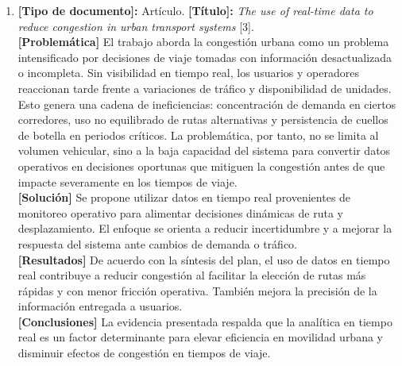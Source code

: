 \begin{enumerate}
    \item \textbf{[Tipo de documento]:} Artículo. \textbf{[Título]:} \textit{The use of real-time data to reduce congestion in urban transport systems} [3].\\
    \textbf{[Problemática]} El trabajo aborda la congesti\'{o}n urbana como un problema intensificado por decisiones de viaje tomadas con informaci\'{o}n desactualizada o incompleta. Sin visibilidad en tiempo real, los usuarios y operadores reaccionan tarde frente a variaciones de tr\'{a}fico y disponibilidad de unidades. Esto genera una cadena de ineficiencias: concentraci\'{o}n de demanda en ciertos corredores, uso no equilibrado de rutas alternativas y persistencia de cuellos de botella en periodos cr\'{i}ticos. La problem\'{a}tica, por tanto, no se limita al volumen vehicular, sino a la baja capacidad del sistema para convertir datos operativos en decisiones oportunas que mitiguen la congesti\'{o}n antes de que impacte severamente en los tiempos de viaje.\\
    \textbf{[Solución]} Se propone utilizar datos en tiempo real provenientes de monitoreo operativo para alimentar decisiones dinámicas de ruta y desplazamiento. El enfoque se orienta a reducir incertidumbre y a mejorar la respuesta del sistema ante cambios de demanda o tráfico.\\
    \textbf{[Resultados]} De acuerdo con la síntesis del plan, el uso de datos en tiempo real contribuye a reducir congestión al facilitar la elección de rutas más rápidas y con menor fricción operativa. También mejora la precisión de la información entregada a usuarios.\\
    \textbf{[Conclusiones]} La evidencia presentada respalda que la analítica en tiempo real es un factor determinante para elevar eficiencia en movilidad urbana y disminuir efectos de congestión en tiempos de viaje.


\end{enumerate}
